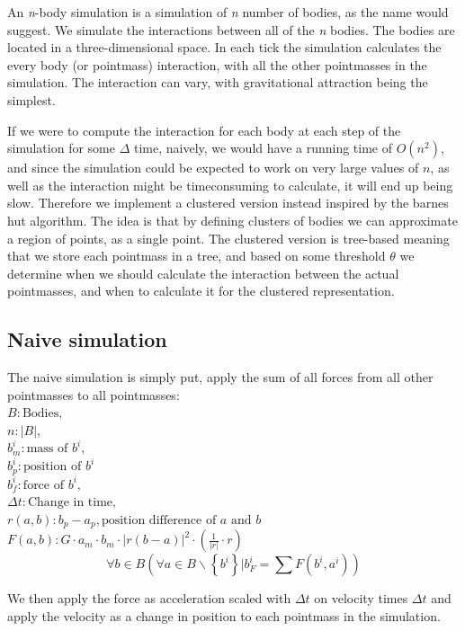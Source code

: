 An \textit{n}-body simulation is a simulation of \textit{n} number of bodies, as
the name would suggest. We simulate the interactions between all of the
\textit{n} bodies. The bodies are located in a three-dimensional space. In each
tick the simulation calculates the every body (or pointmass) interaction, with
all the other pointmasses in the simulation. The interaction can vary, with
gravitational attraction being the simplest.

If we were to compute the interaction for each body at each step of the
simulation for some $\Delta$ time, naively, we would have a running time of
$O(n^2)$, and since the simulation could be expected to work on very large
values of $n$, as well as the interaction might be timeconsuming to calculate,
it will end up being slow. Therefore we implement a clustered version instead
inspired by the barnes hut algorithm. The idea is that by defining clusters of
bodies we can approximate a region of points, as a single point. The clustered
version is tree-based meaning that we store each pointmass in a tree, and based
on some threshold $\theta$ we determine when we should calculate the interaction
between the actual pointmasses, and when to calculate it for the clustered
representation.
\subsection{Naive simulation}
The naive simulation is simply put, apply the sum of all forces from all
other pointmasses to all pointmasses:         \\
$B: \text{Bodies},$                           \\
$n: |B|,$                                     \\
$b^i_m: \text{mass of } b^i,$                 \\
$b^i_p: \text{position of } b^i $\\
$b^i_f: \text{force of } b^i,$                \\
$\Delta t: \text{Change in time},$                \\
$r(a, b): b_p - a_p, \text{position difference of $a$ and $b$}$\\
$F(a, b): G \cdot a_m \cdot b_m \cdot |r(b - a)|^2 \cdot \left(\frac{1}{|r|} \cdot r\right)$
$$\forall b \in B (\forall a \in B \backslash \left\{ b^i\right\} | b^i_F = \sum F(b^i, a^i))$$

We then apply the force as acceleration scaled with $\Delta t$ on velocity
times $\Delta t$ and apply the velocity as a change in position to each
pointmass in the simulation.

